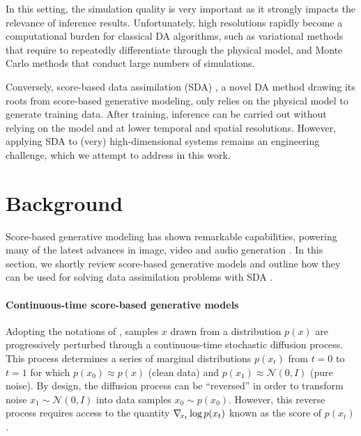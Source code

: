 In this setting, the simulation quality is very important as it strongly impacts the relevance of inference results. Unfortunately, high resolutions rapidly become a computational burden for classical DA algorithms, such as variational methods \cite{lorenc1986analysis, ledimet1986variational, tremolet2006accounting, tremolet2007modelerror, fisher2011weakconstraint} that require to repeatedly differentiate through the physical model, and Monte Carlo methods \cite{evensen1994sequential, liu1998sequential, hamill2006ensemblebased, doucet2011tutorial} that conduct large numbers of simulations.

Conversely, score-based data assimilation (SDA) \cite{rozet2023scorebased}, a novel DA method drawing its roots from score-based generative modeling, only relies on the physical model to generate training data. After training, inference can be carried out without relying on the model and at lower temporal and spatial resolutions. However, applying SDA to (very) high-dimensional systems remains an engineering challenge, which we attempt to address in this work.

\section{Background}

Score-based generative modeling has shown remarkable capabilities, powering many of the latest advances in image, video and audio generation \cite{rombach2022highresolution, ramesh2022hierarchical, saharia2022photorealistic, ho2022video, goel2022its}. In this section, we shortly review score-based generative models and outline how they can be used for solving data assimilation problems with SDA \cite{rozet2023scorebased}.

\paragraph{Continuous-time score-based generative models}
Adopting the notations of \textcite{rozet2023scorebased}, samples $x$ drawn from a distribution $p(x)$ are progressively perturbed through a continuous-time stochastic diffusion process. This process determines a series of marginal distributions $p(x_t)$ from $t=0$ to $t=1$ for which $p(x_0) \approx p(x)$ (clean data) and $p(x_1) \approx \mathcal{N}(0, I)$ (pure noise). By design, the diffusion process can be \enquote{reversed} in order to transform noise $x_1 \sim \mathcal{N}(0, I)$ into data samples $x_0 \sim p(x_0)$. However, this reverse process requires access to the quantity $\nabla_{\!{x_t}} \log p(x_t)$ known as the score of $p(x_t)$.

